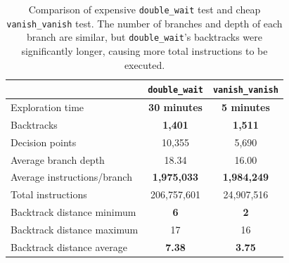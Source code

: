 \begin{table}[h]
	\small
	\centering
	\begin{tabular}{|l||c|c|}
		\hline
		& \texttt{double\_wait} & \texttt{vanish\_vanish} \\
		\hline\hline
		Exploration time & {\bf 30 minutes} & {\bf 5 minutes} \\
		\hline
		Backtracks & {\bf 1,401} & {\bf 1,511} \\
		\hline
		Decision points & 10,355 & 5,690 \\
		\hline
		Average branch depth & 18.34 & 16.00 \\
		\hline
		Average instructions/branch& {\bf 1,975,033} & {\bf 1,984,249} \\
		\hline
		Total instructions & 206,757,601 & 24,907,516 \\
		\hline
		Backtrack distance minimum & {\bf 6} & {\bf 2} \\
		\hline
		Backtrack distance maximum & 17 & 16 \\
		\hline
		Backtrack distance average & {\bf 7.38}  & {\bf 3.75} \\
		\hline
	\end{tabular}
	\caption{Comparison of expensive \texttt{double\_wait} test and cheap \texttt{vanish\_vanish} test. The number of branches and depth of each branch are similar, but \texttt{double\_wait}'s backtracks were significantly longer, causing more total instructions to be executed.}
	\label{fig:nadim-stats}
\end{table}

